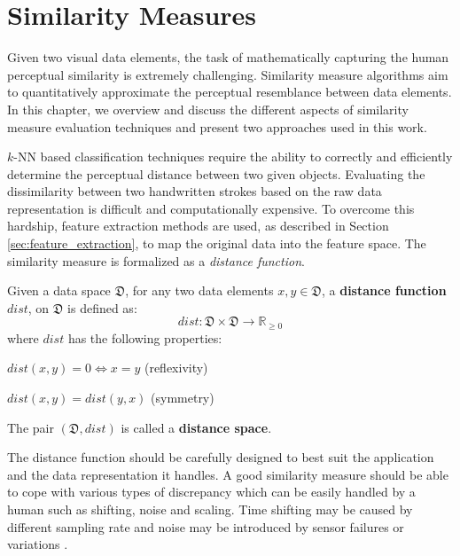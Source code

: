 \newpage{}

\section{Similarity Measures}
\label{sec:similarity_measures}

\iftoggle{edit-mode}{\hspace{0pt}\marginpar{Introduction}}{}
Given two visual data elements, the task of mathematically capturing the human perceptual similarity is extremely challenging. 
Similarity measure algorithms aim to quantitatively approximate the perceptual resemblance between data elements. In this chapter, we overview and discuss the different aspects of similarity measure evaluation techniques and present two approaches used in this work.

\iftoggle{edit-mode}{\hspace{0pt}\marginpar{Intuition}}{}
$k$-NN based classification techniques require the ability to correctly and efficiently determine the perceptual distance between two given objects.
Evaluating the dissimilarity between two handwritten strokes based on the raw data representation is difficult and computationally expensive. 
To overcome this hardship, feature extraction methods are used, as described in Section \ref{sec:feature_extraction}, to map the original data into the feature space.  
The similarity measure is formalized as a \emph{distance function}. 
\begin{definition}
Given a data space $\mathfrak{D}$, for any two data elements $x,y \in \mathfrak{D}$, a \textbf{distance function} $dist$, on $\mathfrak{D}$ is defined as:
\begin{equation}
dist: \mathfrak{D} \times \mathfrak{D} \longrightarrow \mathds{R}_{\geq 0} 
\end{equation}
where $dist$ has the following properties:
\begin{compactitem}
\item $dist(x,y)=0 \Leftrightarrow x=y$ (reflexivity)
\item $dist(x,y) = dist(y,x)$ (symmetry)
\end{compactitem}
The pair $(\mathfrak{D},dist)$ is called a \textbf{distance space}.
\label{def:distance_function}
\end{definition}

\iftoggle{edit-mode}{\hspace{0pt}\marginpar{Properties of a good dissimilarity measure.}}{}
The distance function should be carefully designed to best suit the application and the data representation it handles.
A good similarity measure should be able to cope with various types of discrepancy which can be easily handled by a human such as shifting, noise and scaling. Time shifting may be caused by different sampling rate and noise may be introduced by sensor failures or variations \cite{chen2005similarity}.

